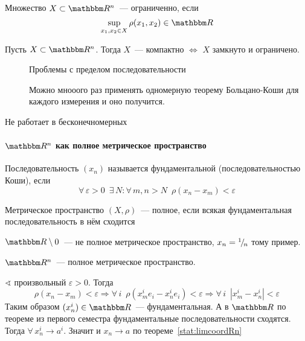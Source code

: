 \documentclass[12pt]{../../notes}
\begin{document}
\begin{defn}\label{defn:limitedsetRn}
  Множество $X\subset \R^n$~--- ограниченно, если 
  \[
    \sup_{x_1, x_2 \in X} \rho (x_1, x_2) \in \R
  \]
\end{defn}

\begin{thrm}\label{thrm:compclosopenRn}
  Пусть $X\subset \R^n$. Тогда $X$~--- компактно $\Leftrightarrow$ $X$ замкнуто и ограничено.
\end{thrm}
\begin{ittproof}
  \begin{description}
    \item[\circlearound{$\Rightarrow$}] Проблемы с пределом последовательности
    \item[\circlearound{$\Leftarrow$}] Можно мнооого раз применять одномерную теорему Больцано-Коши
      для каждого измерения и оно получится.
  \end{description}
\end{ittproof}
\begin{rem*}
  Не работает в бесконечномерных
\end{rem*}

\paragraph{\texorpdfstring{$\R^n$}{R\^{}n} как полное метрическое пространство}

\begin{defn}\label{defn:cauchyseq}
  Последовательность $(x_n)$ называется фундаментальной (последовательностью Коши),
  если 
  \[
    \forall\, \varepsilon > 0 \;\: \exists\, N\colon \forall\,m,n>N \;\: \rho(x_n - x_m) < \varepsilon 
  \]
\end{defn}

\begin{defn}\label{defn:comtmetspc}
  Метрическое пространство $(X,\rho)$~--- полное, если всякая фундаментальная последовательность
  в нём  сходится
\end{defn}

\begin{exmp*}
  $\R \setminus 0$~--- не полное метрическое пространство, $x_n = {}^{1}\!/_{\!n}$ тому пример.
\end{exmp*}

\begin{stat}\label{stat:comtRn}
  $\R^n$~--- полное метрическое пространство.
\end{stat}
\begin{itlproof}
  $\sphericalangle$ произвольный $\varepsilon > 0$. Тогда 
  \[
    \rho(x_n - x_m) < \varepsilon 
    \Rightarrow \forall\, i \;\: \rho(x_m^i e_i - x_n^i e_i) < \varepsilon
    \Rightarrow \forall\, i \;\: |x_m^i - x_n^i| < \varepsilon
  \]
  Таким образом $(x_n^i)\in \R$~--- фундаментальная. 
  А в $\R$ по теореме из первого семестра фундаментальные последовательности сходятся.
  Тогда $\forall\, x_n^i \to a^i$. Значит и $x_n \to a$ по теореме~\ref{stat:limcoordRn}
\end{itlproof}
\end{document}
